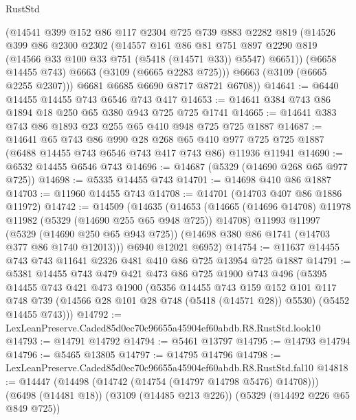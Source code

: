\begin{lexlean}{RustStd}
\begin{coremodule}
          (@14541
            @399
            @152
            @86
            @117
            @2304
            @725
            @739
            @883
            @2282
            @819
            (@14526
              @399
              @86
              @2300
              @2302
              (@14557
                @161
                @86
                @81
                @751
                @897
                @2290
                @819
                (@14566 @33 @100 @33 @751 (@5418 (@14571 @33)) @5547)
                @6651))
            (@6658 @14455 @743)
            @6663
            (@3109 (@6665 @2283 @725)))
          @6663
          (@3109 (@6665 @2255 @2307)))
        @6681
        @6685
        @6690
        @8717
        @8721
        @6708))
@14641 := @6440 @14455 @14455 @743 @6546 @743 @417
@14653 := @14641 @384 @743 @86 @1894 @18 @250 @65 @380 @943 @725 @725 @1741
@14665 := @14641 @383 @743 @86 @1893 @23 @255 @65 @410 @948 @725 @725 @1887
@14687 := @14641
    @65
    @743
    @86
    @990
    @28
    @268
    @65
    @410
    @977
    @725
    @725
    @1887
    (@6488 @14455 @743 @6546 @743 @417 @743 @86)
    @11936
    @11941
@14690 := @6532 @14455 @6546 @743
@14696 := @14687 (@5329 (@14690 @268 @65 @977 @725))
@14698 := @5335 @14455 @743
@14701 := @14698 @410 @86 @1887
@14703 := @11960 @14455 @743
@14708 := @14701 (@14703 @407 @86 @1886 @11972)
@14742 := @14509
    (@14635
      (@14653
        (@14665 (@14696 @14708) @11978 @11982 (@5329 (@14690 @255 @65 @948 @725)) @14708)
        @11993
        @11997
        (@5329 (@14690 @250 @65 @943 @725))
        (@14698 @380 @86 @1741 (@14703 @377 @86 @1740 @12013)))
      @6940
      @12021
      @6952)
@14754 := @11637 @14455 @743 @743 @11641 @2326 @481 @410 @86 @725 @13954 @725 @1887
@14791 := @5381
    @14455
    @743
    @479
    @421
    @473
    @86
    @725
    @1900
    @743
    @496
    (@5395
      @14455
      @743
      @421
      @473
      @1900
      (@5356
        @14455
        @743
        @159
        @152
        @101
        @117
        @748
        @739
        (@14566 @28 @101 @28 @748 (@5418 (@14571 @28)) @5530)
        (@5452 @14455 @743)))
@14792 := LexLeanPreserve.Caded85d0ec70c96655a45904ef60abdb.R8.RustStd.look10
@14793 := @14791 @14792
@14794 := @5461 @13797
@14795 := @14793 @14794
@14796 := @5465 @13805
@14797 := @14795 @14796
@14798 := LexLeanPreserve.Caded85d0ec70c96655a45904ef60abdb.R8.RustStd.fal10
@14818 := @14447
    (@14498 (@14742 (@14754 (@14797 @14798 @5476) @14708)))
    (@6498 (@14481 @18))
    (@3109 (@14485 @213 @226))
    (@5329 (@14492 @226 @65 @849 @725))

\end{coremodule}
\end{lexlean}
